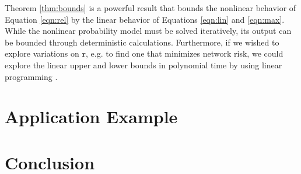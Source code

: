 \documentclass{article}
\begin{document}
Theorem \ref{thm:bounds} is a powerful result that bounds the nonlinear behavior of Equation \ref{eqn:rel} by the linear behavior of Equations \ref{eqn:lin} and \ref{eqn:max}. While the nonlinear probability model must be solved iteratively, its output can be bounded through deterministic calculations. Furthermore, if we wished to explore variations on $\mathbf{r}$, e.g. to find one that minimizes network risk, we could explore the linear upper and lower bounds in polynomial time by using linear programming \citep{lp}.
\section{Application Example}

\section{Conclusion}



\end{document}
